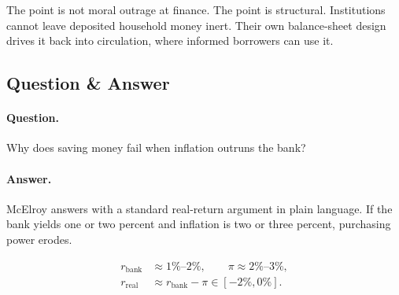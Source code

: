 \begin{figure}[h]
\centering
{}
\end{figure}

The point is not moral outrage at finance. The point is structural. Institutions cannot leave deposited household money inert. Their own balance-sheet design drives it back into circulation, where informed borrowers can use it.

\subsection{Question \& Answer}

\paragraph{Question.} Why does saving money fail when inflation outruns the bank?

\paragraph{Answer.} McElroy answers with a standard real-return argument in plain language. If the bank yields one or two percent and inflation is two or three percent, purchasing power erodes.

\begin{align}
r_{\text{bank}} &\approx 1\%\text{--}2\%,\qquad \pi \approx 2\%\text{--}3\%,\\
r_{\text{real}} &\approx r_{\text{bank}} - \pi \in [-2\%,0\%].
\end{align}

